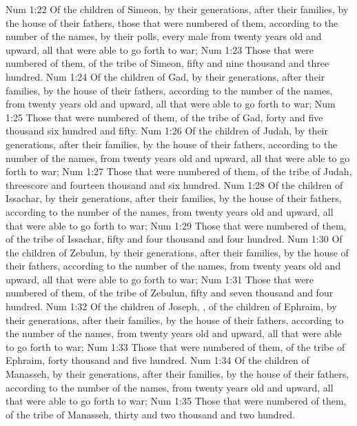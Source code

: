 \vs Num 1:22 Of the children of Simeon, by their generations, after their families, by the house of their fathers, those that were numbered of them, according to the number of the names, by their polls, every male from twenty years old and upward, all that were able to go forth to war;
\vs Num 1:23 Those that were numbered of them,  of the tribe of Simeon,  fifty and nine thousand and three hundred.
\vs Num 1:24 Of the children of Gad, by their generations, after their families, by the house of their fathers, according to the number of the names, from twenty years old and upward, all that were able to go forth to war;
\vs Num 1:25 Those that were numbered of them,  of the tribe of Gad,  forty and five thousand six hundred and fifty.
\vs Num 1:26 Of the children of Judah, by their generations, after their families, by the house of their fathers, according to the number of the names, from twenty years old and upward, all that were able to go forth to war;
\vs Num 1:27 Those that were numbered of them,  of the tribe of Judah,  threescore and fourteen thousand and six hundred.
\vs Num 1:28 Of the children of Issachar, by their generations, after their families, by the house of their fathers, according to the number of the names, from twenty years old and upward, all that were able to go forth to war;
\vs Num 1:29 Those that were numbered of them,  of the tribe of Issachar,  fifty and four thousand and four hundred.
\vs Num 1:30 Of the children of Zebulun, by their generations, after their families, by the house of their fathers, according to the number of the names, from twenty years old and upward, all that were able to go forth to war;
\vs Num 1:31 Those that were numbered of them,  of the tribe of Zebulun,  fifty and seven thousand and four hundred.
\vs Num 1:32 Of the children of Joseph, , of the children of Ephraim, by their generations, after their families, by the house of their fathers, according to the number of the names, from twenty years old and upward, all that were able to go forth to war;
\vs Num 1:33 Those that were numbered of them,  of the tribe of Ephraim,  forty thousand and five hundred.
\vs Num 1:34 Of the children of Manasseh, by their generations, after their families, by the house of their fathers, according to the number of the names, from twenty years old and upward, all that were able to go forth to war;
\vs Num 1:35 Those that were numbered of them,  of the tribe of Manasseh,  thirty and two thousand and two hundred.
